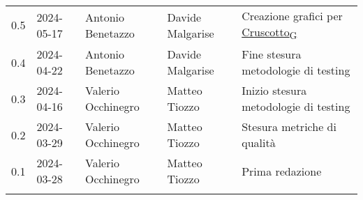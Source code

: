 \documentclass[italian,12pt]{article} %
\begin{document}
\begin{table}[!h]
\begin{center}
\begin{tabular}{ l l l l p{6cm} }
			0.5  & 2024-05-17 & Antonio Benetazzo  & Davide Malgarise   & Creazione grafici per \href{https://7last.github.io/docs/pb/documentazione-interna/glossario\#cruscotto}{Cruscotto\textsubscript{G}}                            \\
			0.4  & 2024-04-22 & Antonio Benetazzo  & Davide Malgarise   & Fine stesura metodologie di testing                        \\
			0.3  & 2024-04-16 & Valerio Occhinegro & Matteo Tiozzo      & Inizio stesura metodologie di testing                      \\
			0.2  & 2024-03-29 & Valerio Occhinegro & Matteo Tiozzo      & Stesura metriche di qualità                                \\
			0.1  & 2024-03-28 & Valerio Occhinegro & Matteo Tiozzo      & Prima redazione                                            \\
			\\[-1.5ex] \hline
		\end{tabular}
	\end{center}
\end{table}
\captionsetup[table]{list=yes}
\newpage
\tableofcontents
\listoftables
\listoffigures
\newpage





\end{document}
